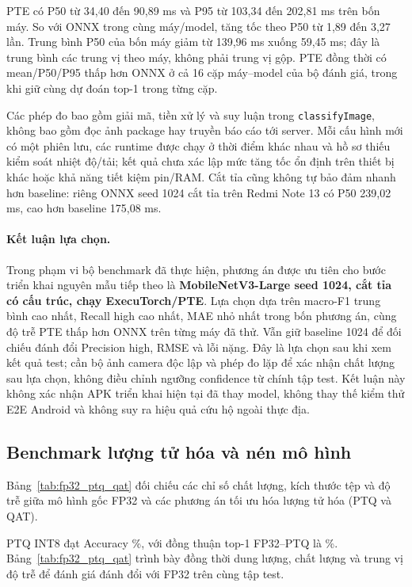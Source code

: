 

PTE có P50 từ 34,40 đến 90,89 ms và P95 từ 103,34 đến 202,81 ms trên bốn máy. So với ONNX trong cùng máy/model, tăng tốc theo P50 từ 1,89 đến 3,27 lần. Trung bình P50 của bốn máy giảm từ 139,96 ms xuống 59,45 ms; đây là trung bình các trung vị theo máy, không phải trung vị gộp. PTE đồng thời có mean/P50/P95 thấp hơn ONNX ở cả 16 cặp máy--model của bộ đánh giá, trong khi giữ cùng dự đoán top-1 trong từng cặp.

Các phép đo bao gồm giải mã, tiền xử lý và suy luận trong \texttt{classifyImage}, không bao gồm đọc ảnh package hay truyền báo cáo tới server. Mỗi cấu hình mới có một phiên lưu, các runtime được chạy ở thời điểm khác nhau và hồ sơ thiếu kiểm soát nhiệt độ/tải; kết quả chưa xác lập mức tăng tốc ổn định trên thiết bị khác hoặc khả năng tiết kiệm pin/RAM. Cắt tỉa cũng không tự bảo đảm nhanh hơn baseline: riêng ONNX seed 1024 cắt tỉa trên Redmi Note 13 có P50 239,02 ms, cao hơn baseline 175,08 ms.

\paragraph{Kết luận lựa chọn.}
Trong phạm vi bộ benchmark đã thực hiện, phương án được ưu tiên cho bước triển khai nguyên mẫu tiếp theo là \textbf{MobileNetV3-Large seed 1024, cắt tỉa có cấu trúc, chạy ExecuTorch/PTE}. Lựa chọn dựa trên macro-F1 trung bình cao nhất, Recall high cao nhất, MAE nhỏ nhất trong bốn phương án, cùng độ trễ PTE thấp hơn ONNX trên từng máy đã thử. Vẫn giữ baseline 1024 để đối chiếu đánh đổi Precision high, RMSE và lỗi nặng. Đây là lựa chọn sau khi xem kết quả test; cần bộ ảnh camera độc lập và phép đo lặp để xác nhận chất lượng sau lựa chọn, không điều chỉnh ngưỡng confidence từ chính tập test. Kết luận này không xác nhận APK triển khai hiện tại đã thay model, không thay thế kiểm thử E2E Android và không suy ra hiệu quả cứu hộ ngoài thực địa.

\subsection{Benchmark lượng tử hóa và nén mô hình}
Bảng~\ref{tab:fp32_ptq_qat} đối chiếu các chỉ số chất lượng, kích thước tệp và độ trễ giữa mô hình gốc FP32 và các phương án tối ưu hóa lượng tử hóa (PTQ và QAT).



PTQ INT8 đạt Accuracy \PTQAccuracy\%, với đồng thuận top-1 FP32--PTQ là \PTQAgreement\%. Bảng~\ref{tab:fp32_ptq_qat} trình bày đồng thời dung lượng, chất lượng và trung vị độ trễ để đánh giá đánh đổi với FP32 trên cùng tập test.

